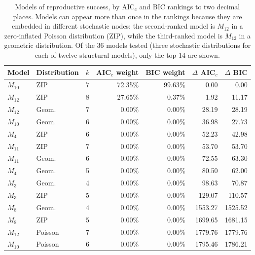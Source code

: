 \begin{table}[htbp]
  \centering
    \begin{tabular}{llrrrrr}
    \hline
    \hline
    Model & Distribution & $k$ & AIC$_c$ weight & BIC weight & $\Delta$ AIC$_c$ & $\Delta$ BIC \\
    \hline
    $M_{10}$ & ZIP   & 7     & 72.35\% & 99.63\% & 0.00  & 0.00 \\
    $M_{12}$ & ZIP   & 8     & 27.65\% & 0.37\% & 1.92  & 11.17 \\
    $M_{12}$ & Geom. & 7     & 0.00\% & 0.00\% & 28.19 & 28.19 \\
    $M_{10}$ & Geom. & 6     & 0.00\% & 0.00\% & 36.98 & 27.73 \\
    $M_4$  & ZIP   & 6     & 0.00\% & 0.00\% & 52.23 & 42.98 \\
    $M_{11}$ & ZIP   & 7     & 0.00\% & 0.00\% & 53.70 & 53.70 \\
    $M_{11}$ & Geom. & 6     & 0.00\% & 0.00\% & 72.55 & 63.30 \\
    $M_{4}$ & Geom. & 5     & 0.00\% & 0.00\% & 80.50 & 62.00 \\
    $M_3$  & Geom. & 4     & 0.00\% & 0.00\% & 98.63 & 70.87 \\
    $M_3$  & ZIP   & 5     & 0.00\% & 0.00\% & 129.07 & 110.57 \\
    $M_8$  & Geom. & 4     & 0.00\% & 0.00\% & 1553.27 & 1525.52 \\
    $M_8$  & ZIP   & 5     & 0.00\% & 0.00\% & 1699.65 & 1681.15 \\
    $M_{12}$ & Poisson & 7     & 0.00\% & 0.00\% & 1779.76 & 1779.76 \\
    $M_{10}$ & Poisson & 6     & 0.00\% & 0.00\% & 1795.46 & 1786.21 \\
    \hline
    \end{tabular}%
    \caption{Models of reproductive success, by AIC$_c$ and BIC rankings to two decimal places.  Models can appear more than once in the rankings because they are embedded in different stochastic nodes: the second-ranked model is $M_{12}$ in a zero-inflated Poisson distribution (ZIP), while the third-ranked model is $M_{12}$ in a geometric distribution.  Of the 36 models tested (three stochastic distributions for each of twelve structural models), only the top 14 are shown.}
  \label{tab:RScompare}%
\end{table}%


